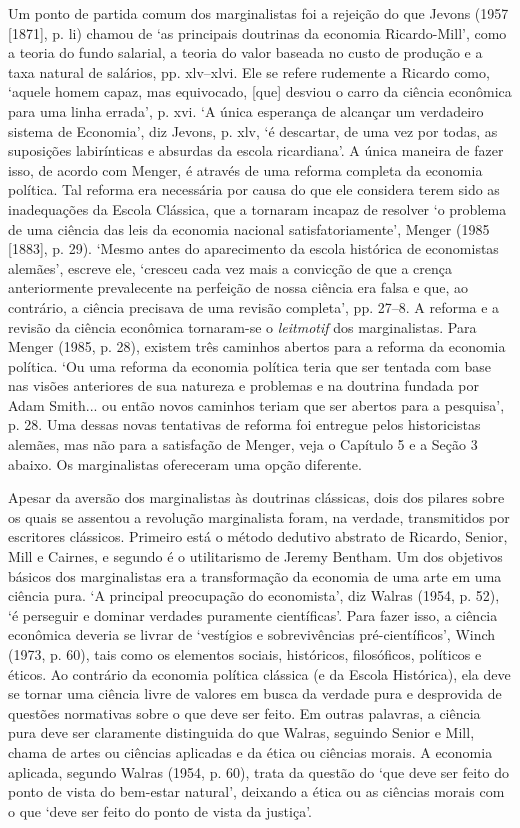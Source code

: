 \documentclass[12pt]{article}
\begin{document}
Um ponto de partida comum dos marginalistas foi a rejeição do que Jevons (1957 [1871], p. li) chamou de ‘as principais doutrinas da economia Ricardo-Mill’, como a teoria do fundo salarial, a teoria do valor baseada no custo de produção e a taxa natural de salários, pp. xlv–xlvi. Ele se refere rudemente a Ricardo como, ‘aquele homem capaz, mas equivocado, [que] desviou o carro da ciência econômica para uma linha errada’, p. xvi. ‘A única esperança de alcançar um verdadeiro sistema de Economia’, diz Jevons, p. xlv, ‘é descartar, de uma vez por todas, as suposições labirínticas e absurdas da escola ricardiana’. A única maneira de fazer isso, de acordo com Menger, é através de uma reforma completa da economia política. Tal reforma era necessária por causa do que ele considera terem sido as inadequações da Escola Clássica, que a tornaram incapaz de resolver ‘o problema de uma ciência das leis da economia nacional satisfatoriamente’, Menger (1985 [1883], p. 29). ‘Mesmo antes do aparecimento da escola histórica de economistas alemães’, escreve ele, ‘cresceu cada vez mais a convicção de que a crença anteriormente prevalecente na perfeição de nossa ciência era falsa e que, ao contrário, a ciência precisava de uma revisão completa’, pp. 27–8. A reforma e a revisão da ciência econômica tornaram-se o \textit{leitmotif} dos marginalistas. Para Menger (1985, p. 28), existem três caminhos abertos para a reforma da economia política. ‘Ou uma reforma da economia política teria que ser tentada com base nas visões anteriores de sua natureza e problemas e na doutrina fundada por Adam Smith... ou então novos caminhos teriam que ser abertos para a pesquisa’, p. 28. Uma dessas novas tentativas de reforma foi entregue pelos historicistas alemães, mas não para a satisfação de Menger, veja o Capítulo 5 e a Seção 3 abaixo. Os marginalistas ofereceram uma opção diferente.

Apesar da aversão dos marginalistas às doutrinas clássicas, dois dos pilares sobre os quais se assentou a revolução marginalista foram, na verdade, transmitidos por escritores clássicos. Primeiro está o método dedutivo abstrato de Ricardo, Senior, Mill e Cairnes, e segundo é o utilitarismo de Jeremy Bentham. Um dos objetivos básicos dos marginalistas era a transformação da economia de uma arte em uma ciência pura. ‘A principal preocupação do economista’, diz Walras (1954, p. 52), ‘é perseguir e dominar verdades puramente científicas’. Para fazer isso, a ciência econômica deveria se livrar de ‘vestígios e sobrevivências pré-científicos’, Winch (1973, p. 60), tais como os elementos sociais, históricos, filosóficos, políticos e éticos. Ao contrário da economia política clássica (e da Escola Histórica), ela deve se tornar uma ciência livre de valores em busca da verdade pura e desprovida de questões normativas sobre o que deve ser feito. Em outras palavras, a ciência pura deve ser claramente distinguida do que Walras, seguindo Senior e Mill, chama de artes ou ciências aplicadas e da ética ou ciências morais. A economia aplicada, segundo Walras (1954, p. 60), trata da questão do ‘que deve ser feito do ponto de vista do bem-estar natural’, deixando a ética ou as ciências morais com o que ‘deve ser feito do ponto de vista da justiça’.
\end{document}
